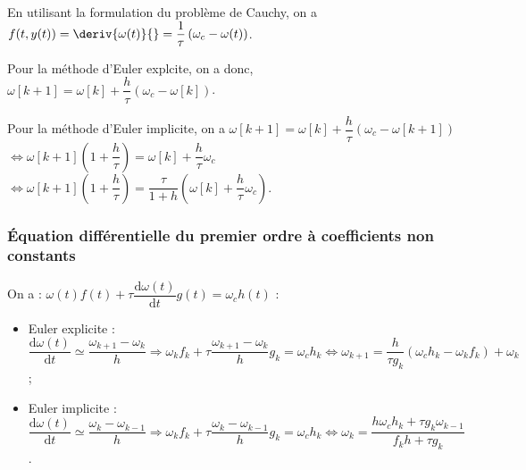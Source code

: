 En utilisant la formulation du problème de Cauchy, on a $f(t,y(t)) = \deriv{\omega(t)}{} = \dfrac{1}{\tau}\left(\omega_c - \omega(t)\right)$.




Pour la méthode d'Euler explcite, on a donc, $\omega[k+1]=\omega[k]+\dfrac{h}{\tau}\left(\omega_c - \omega[k]\right)$.



Pour la méthode d'Euler implicite, on a $\omega[k+1]=\omega[k]+\dfrac{h}{\tau}\left(\omega_c - \omega[k+1]\right)$ 
$\Leftrightarrow \omega[k+1] \left(1+\dfrac{h}{\tau}\right) =\omega[k] + \dfrac{h}{\tau}\omega_c$ 
$\Leftrightarrow \omega[k+1] \left(1+\dfrac{h}{\tau}\right) =\dfrac{\tau}{1+h}\left(\omega[k] + \dfrac{h}{\tau}\omega_c\right)$.


\subsubsection{Équation différentielle du premier ordre à coefficients non constants}

On a : $\omega(t) f(t) + \tau \dfrac{\text{d} \omega(t)}{\text{d}t} g(t)  = \omega_c h(t)$ :
\begin{itemize}
\item Euler explicite : $\dfrac{\text{d} \omega(t)}{\text{d}t}\simeq \dfrac{\omega_{k+1}-\omega_k}{h} \Rightarrow  \omega_k f_k+ \tau  \dfrac{\omega_{k+1}-\omega_k}{h} g_k= \omega_c h_k  \Leftrightarrow \omega_{k+1} =\dfrac{h}{\tau g_k} \left(\omega_c h_k - \omega_k f_k \right)+\omega_k$;
\item Euler implicite : $\dfrac{\text{d} \omega(t)}{\text{d}t}\simeq \dfrac{\omega_{k}-\omega_{k-1}}{h} \Rightarrow  \omega_k f_k+ \tau \dfrac{\omega_{k}-\omega_{k-1}}{h} g_k= \omega_c h_k  \Leftrightarrow \omega_k =  \dfrac{h\omega_c h_k +\tau g_k\omega_{k-1}}{f_k h+   \tau g_k}  $.
\end{itemize}


